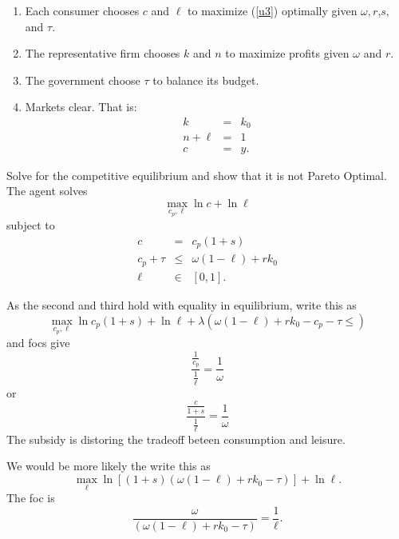 \documentclass{sebase}
\begin{document}
\begin{enumerate}
\item Each consumer chooses $c$ and $\ell $ to maximize (\ref{u3}) optimally
given $\omega ,r$,$s,$ and $\tau $.

\item The representative firm chooses $k$ and $n$ to maximize profits given $%
\omega $ and $r.$

\item The government choose $\tau $ to balance its budget.

\item Markets clear. That is:%
\begin{eqnarray*}
k &=&k_{0} \\
n+\ell &=&1 \\
c &=&y.
\end{eqnarray*}
\end{enumerate}

\pagebreak

Solve for the competitive equilibrium and show that it is not Pareto
Optimal. The agent solves%
\begin{equation*}
\underset{c_{p},\ell }{\max }\ln c+\ln \ell
\end{equation*}%
subject to%
\begin{eqnarray*}
c &=&c_{p}\left( 1+s\right) \\
c_{p}+\tau &\leq &\omega \left( 1-\ell \right) +rk_{0} \\
\ell &\in &\left[ 0,1\right] .
\end{eqnarray*}%
\pagebreak

As the second and third hold with equality in equilibrium, write this as%
\begin{equation*}
\underset{c_{p},\ell }{\max }\ln c_{p}\left( 1+s\right) +\ln \ell +\lambda
\left( \omega \left( 1-\ell \right) +rk_{0}-c_{p}-\tau \leq \right)
\end{equation*}%
and focs give 
\begin{equation*}
\frac{\frac{1}{c_{p}}}{\frac{1}{\ell }}=\frac{1}{\omega }
\end{equation*}%
or%
\begin{equation*}
\frac{\frac{c}{1+s}}{\frac{1}{\ell }}=\frac{1}{\omega }
\end{equation*}%
The subsidy is distoring the tradeoff beteen consumption and leisure.
\pagebreak

We would be more likely the write this as 
\begin{equation*}
\underset{\ell }{\max }\ln \left[ \left( 1+s\right) \left( \omega \left(
1-\ell \right) +rk_{0}-\tau \right) \right] +\ln \ell .
\end{equation*}%
The foc is 
\begin{equation}
\frac{\omega }{\left( \omega \left( 1-\ell \right) +rk_{0}-\tau \right) }=%
\frac{1}{\ell }.  \label{nfoc}
\end{equation}%
\pagebreak
\end{document}

